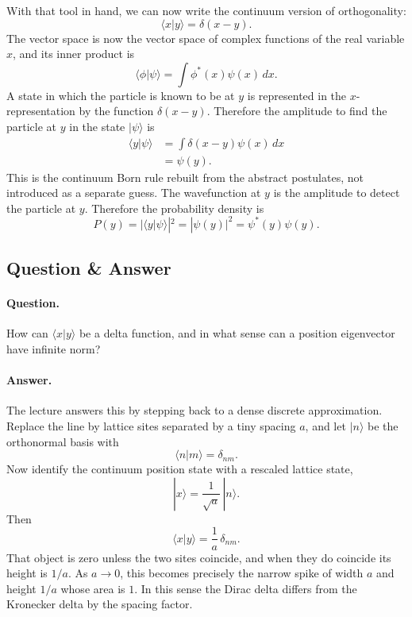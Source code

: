 With that tool in hand, we can now write the continuum version of orthogonality:
\begin{equation}
\langle x|y\rangle = \delta(x-y).
\end{equation}
The vector space is now the vector space of complex functions of the real variable \(x\), and its inner product is
\begin{equation}
\langle \phi|\psi\rangle = \int \phi^*(x)\psi(x)\,dx.
\end{equation}
A state in which the particle is known to be at \(y\) is represented in the \(x\)-representation by the function \(\delta(x-y)\). Therefore the amplitude to find the particle at \(y\) in the state \(|\psi\rangle\) is
\begin{align}
\langle y|\psi\rangle
  &= \int \delta(x-y)\psi(x)\,dx \\
  &= \psi(y).
\end{align}
This is the continuum Born rule rebuilt from the abstract postulates, not introduced as a separate guess. The wavefunction at \(y\) is the amplitude to detect the particle at \(y\). Therefore the probability density is
\begin{equation}
P(y)=|\langle y|\psi\rangle|^2 = |\psi(y)|^2 = \psi^*(y)\psi(y).
\end{equation}

\subsection{Question \& Answer}

\paragraph{Question.} How can \(\langle x|y\rangle\) be a delta function, and in what sense can a position eigenvector have infinite norm?

\paragraph{Answer.} The lecture answers this by stepping back to a dense discrete approximation. Replace the line by lattice sites separated by a tiny spacing \(a\), and let \(|n\rangle\) be the orthonormal basis with
\[
\langle n|m\rangle=\delta_{nm}.
\]
Now identify the continuum position state with a rescaled lattice state,
\[
|x\rangle = \frac{1}{\sqrt a}\,|n\rangle.
\]
Then
\begin{equation}
\langle x|y\rangle = \frac{1}{a}\,\delta_{nm}.
\end{equation}
That object is zero unless the two sites coincide, and when they do coincide its height is \(1/a\). As \(a\to 0\), this becomes precisely the narrow spike of width \(a\) and height \(1/a\) whose area is \(1\). In this sense the Dirac delta differs from the Kronecker delta by the spacing factor.

